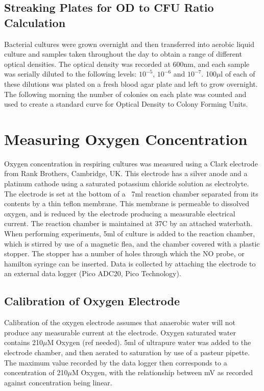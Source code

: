 \subsection{Streaking Plates for OD to CFU Ratio Calculation}
Bacterial cultures were grown overnight and then transferred into aerobic liquid culture and samples taken throughout the day to obtain a range of different optical densities. The optical density was recorded at 600nm, and each sample was serially diluted to the following levels: $10^{-5}$, $10^{-6}$ and $10^{-7}$. 100$\mu$l of each of these dilutions was plated on a fresh blood agar plate and left to grow overnight. The following morning the number of colonies on each plate was counted and used to create a standard curve for Optical Density to Colony Forming Units.

\section{Measuring Oxygen Concentration}
Oxygen concentration in respiring cultures was measured using a Clark electrode \cite{Clark1953} from Rank Brothers, Cambridge, UK. This electrode has a silver anode and a platinum cathode using a saturated potassium chloride solution as electrolyte. The electrode is set at the bottom of a ~7ml reaction chamber separated from its contents by a thin teflon membrane. This membrane is permeable to dissolved oxygen, and is reduced by the electrode producing a measurable electrical current. The reaction chamber is maintained at 37\textdegree C by an attached waterbath.
When performing experiments, 5ml of culture is added to the reaction chamber, which is stirred by use of a magnetic flea, and the chamber covered with a plastic stopper. The stopper has a number of holes through which the NO probe, or hamilton syringe can be inserted. Data is collected by attaching the electrode to an external data logger (Pico ADC20, Pico Technology).
\subsection{Calibration of Oxygen Electrode}
Calibration of the oxygen electrode assumes that anaerobic water will not produce any measurable current at the electrode. Oxygen saturated water contains 210$\mu$M Oxygen (ref needed). 5ml of ultrapure water was added to the electrode chamber, and then aerated to saturation by use of a pasteur pipette. The maximum value recorded by the data logger then corresponds to a concentration of 210$\mu$M Oxygen, with the relationship between mV as recorded against concentration being linear.


